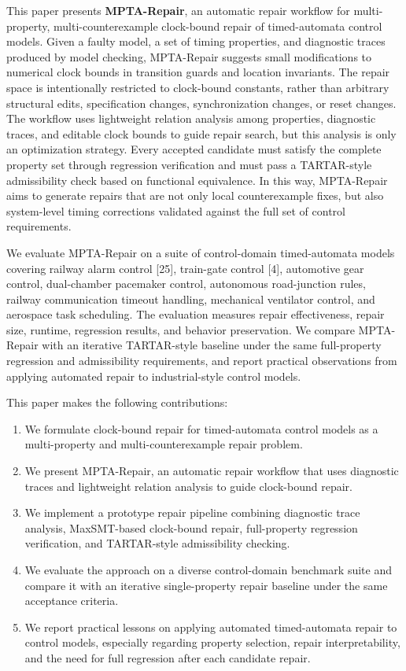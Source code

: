 \documentclass[
]{article}
\providecommand{\tightlist}{%
  \setlength{\itemsep}{0pt}\setlength{\parskip}{0pt}}
\begin{document}
This paper presents \textbf{MPTA-Repair}, an automatic repair workflow
for multi-property, multi-counterexample clock-bound repair of
timed-automata control models. Given a faulty model, a set of timing
properties, and diagnostic traces produced by model checking,
MPTA-Repair suggests small modifications to numerical clock bounds in
transition guards and location invariants. The repair space is
intentionally restricted to clock-bound constants, rather than arbitrary
structural edits, specification changes, synchronization changes, or
reset changes. The workflow uses lightweight relation analysis among
properties, diagnostic traces, and editable clock bounds to guide repair
search, but this analysis is only an optimization strategy. Every
accepted candidate must satisfy the complete property set through
regression verification and must pass a TARTAR-style admissibility check
based on functional equivalence. In this way, MPTA-Repair aims to
generate repairs that are not only local counterexample fixes, but also
system-level timing corrections validated against the full set of
control requirements.

We evaluate MPTA-Repair on a suite of control-domain timed-automata
models covering railway alarm control {[}25{]}, train-gate control
{[}4{]}, automotive gear control, dual-chamber pacemaker control,
autonomous road-junction rules, railway communication timeout handling,
mechanical ventilator control, and aerospace task scheduling. The
evaluation measures repair effectiveness, repair size, runtime,
regression results, and behavior preservation. We compare MPTA-Repair
with an iterative TARTAR-style baseline under the same full-property
regression and admissibility requirements, and report practical
observations from applying automated repair to industrial-style control
models.

This paper makes the following contributions:

\begin{enumerate}
\def\labelenumi{\arabic{enumi}.}
\tightlist
\item
  We formulate clock-bound repair for timed-automata control models as a
  multi-property and multi-counterexample repair problem.
\item
  We present MPTA-Repair, an automatic repair workflow that uses
  diagnostic traces and lightweight relation analysis to guide
  clock-bound repair.
\item
  We implement a prototype repair pipeline combining diagnostic trace
  analysis, MaxSMT-based clock-bound repair, full-property regression
  verification, and TARTAR-style admissibility checking.
\item
  We evaluate the approach on a diverse control-domain benchmark suite
  and compare it with an iterative single-property repair baseline under
  the same acceptance criteria.
\item
  We report practical lessons on applying automated timed-automata
  repair to control models, especially regarding property selection,
  repair interpretability, and the need for full regression after each
  candidate repair.
\end{enumerate}
\end{document}
